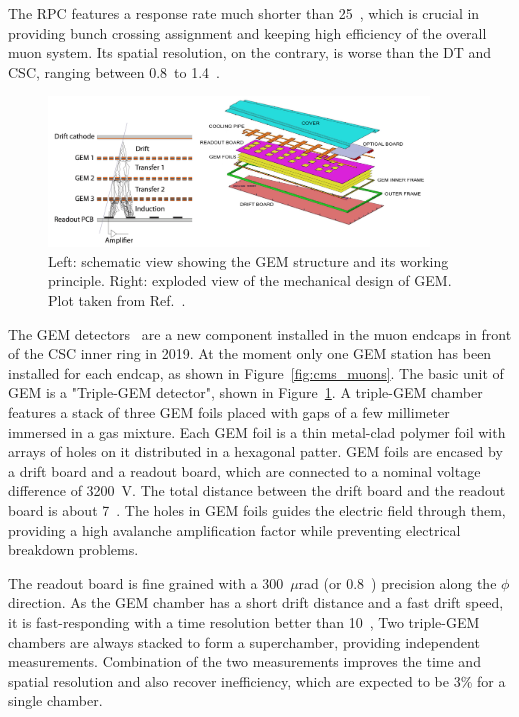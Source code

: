 The RPC features a response rate much shorter than 25~\ns,
which is crucial in providing bunch crossing assignment and keeping high efficiency of the overall muon system.
Its spatial resolution, on the contrary, is worse than the DT and CSC, ranging between 0.8~\cm to 1.4~\cm.

\begin{figure}[!htb]
    \centering
    \includegraphics[width=0.90\textwidth]{pics/LHC_CMS/GEM.png}
    \caption{Left: schematic view showing the GEM structure and its working principle.
             Right: exploded view of the mechanical design of GEM.
             Plot taken from Ref.~\cite{Colaleo:2021453}.}
    \label{fig:cms_gem}
\end{figure}

The GEM detectors~\cite{Colaleo:2021453} are a new component installed in the muon endcaps in front of the CSC inner ring in 2019.
At the moment only one GEM station has been installed for each endcap, as shown in Figure~\ref{fig:cms_muons}.
The basic unit of GEM is a "Triple-GEM detector", shown in Figure~\ref{fig:cms_gem}.
A triple-GEM chamber features a stack of three GEM foils placed with gaps of a few millimeter immersed in a gas mixture.
Each GEM foil is a thin metal-clad polymer foil with arrays of holes on it distributed in a hexagonal patter. 
GEM foils are encased by a drift board and a readout board, which are connected to a nominal voltage difference of 3200~V.
The total distance between the drift board and the readout board is about 7~\mm.
The holes in GEM foils guides the electric field through them, providing a high avalanche amplification factor while preventing electrical breakdown problems.

The readout board is fine grained with a 300~$\mu$rad (or 0.8~\mm) precision along the $\phi$ direction.
As the GEM chamber has a short drift distance and a fast drift speed, it is fast-responding with a time resolution better than 10~\ns, 
Two triple-GEM chambers are always stacked to form a superchamber, providing independent measurements.
Combination of the two measurements improves the time and spatial resolution and also recover inefficiency, which are expected to be 3\% for a single chamber.

